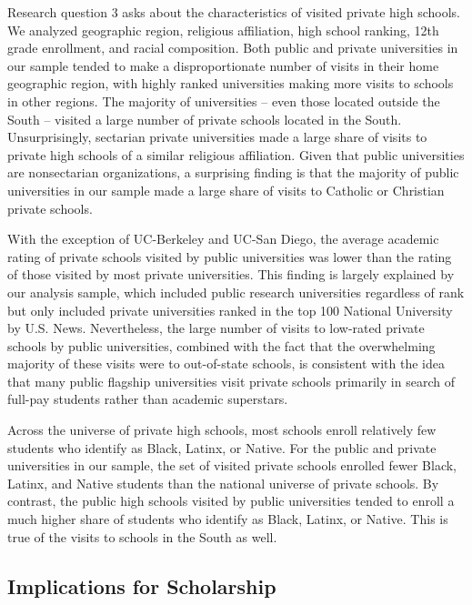 \documentclass[
  12pt,
]{article}
\begin{document}
Research question 3 asks about the characteristics of visited private high schools. We analyzed geographic region, religious affiliation, high school ranking, 12th grade enrollment, and racial composition. Both public and private universities in our sample tended to make a disproportionate number of visits in their home geographic region, with highly ranked universities making more visits to schools in other regions. The majority of universities -- even those located outside the South -- visited a large number of private schools located in the South. Unsurprisingly, sectarian private universities made a large share of visits to private high schools of a similar religious affiliation. Given that public universities are nonsectarian organizations, a surprising finding is that the majority of public universities in our sample made a large share of visits to Catholic or Christian private schools.

With the exception of UC-Berkeley and UC-San Diego, the average academic rating of private schools visited by public universities was lower than the rating of those visited by most private universities. This finding is largely explained by our analysis sample, which included public research universities regardless of rank but only included private universities ranked in the top 100 National University by U.S. News. Nevertheless, the large number of visits to low-rated private schools by public universities, combined with the fact that the overwhelming majority of these visits were to out-of-state schools, is consistent with the idea that many public flagship universities visit private schools primarily in search of full-pay students rather than academic superstars.

Across the universe of private high schools, most schools enroll relatively few students who identify as Black, Latinx, or Native. For the public and private universities in our sample, the set of visited private schools enrolled fewer Black, Latinx, and Native students than the national universe of private schools. By contrast, the public high schools visited by public universities tended to enroll a much higher share of students who identify as Black, Latinx, or Native. This is true of the visits to schools in the South as well.

\hypertarget{implications-for-scholarship}{%
\subsection{Implications for Scholarship}\label{implications-for-scholarship}}
\end{document}
